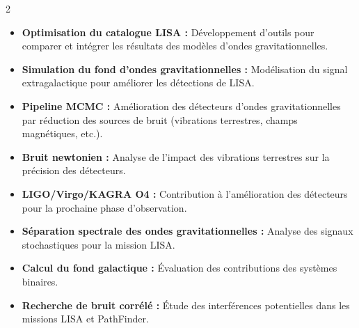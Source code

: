 \documentclass[8pt,a4paper,ragged2e,withhyper]{../_shared/altacv}
\begin{document}


\makecvheader


\begin{paracol}{2}


\begin{itemize}
\item \textbf{Optimisation du catalogue LISA : }Développement d'outils pour comparer et intégrer les résultats des modèles d'ondes gravitationnelles.
\item \textbf{Simulation du fond d’ondes gravitationnelles : }Modélisation du signal extragalactique pour améliorer les détections de LISA.
\end{itemize}
\divider
{}
\begin{itemize}
\item \textbf{Pipeline MCMC : }Amélioration des détecteurs d’ondes gravitationnelles par réduction des sources de bruit (vibrations terrestres, champs magnétiques, etc.).
\item \textbf{Bruit newtonien : }Analyse de l’impact des vibrations terrestres sur la précision des détecteurs.
\item \textbf{LIGO/Virgo/KAGRA O4 : }Contribution à l’amélioration des détecteurs pour la prochaine phase d’observation.
\end{itemize}
\divider
{}
\begin{itemize}
\item \textbf{Séparation spectrale des ondes gravitationnelles : }Analyse des signaux stochastiques pour la mission LISA.
\item \textbf{Calcul du fond galactique : }Évaluation des contributions des systèmes binaires.
\item \textbf{Recherche de bruit corrélé : }Étude des interférences potentielles dans les missions LISA et PathFinder.
\end{itemize}


\end{paracol}
\end{document}
